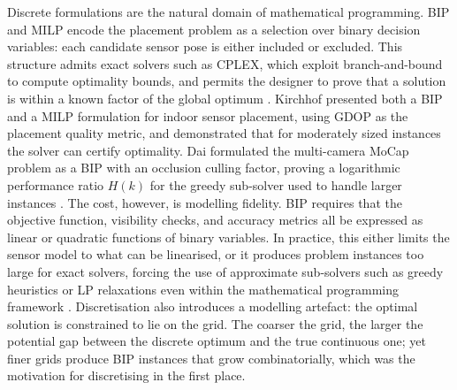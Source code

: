 Discrete formulations are the natural domain of mathematical programming. \gls{BIP} and \gls{MILP} encode the placement problem as a selection over binary decision variables: each candidate sensor pose is either included or excluded. This structure admits exact solvers such as CPLEX, which exploit branch-and-bound to compute optimality bounds, and permits the designer to prove that a solution is within a known factor of the global optimum \parencite{kirchhofOptimalPlacementMultiple2013}. Kirchhof presented both a \gls{BIP} and a \gls{MILP} formulation for indoor sensor placement, using \gls{GDOP} as the placement quality metric, and demonstrated that for moderately sized instances the solver can certify optimality. Dai formulated the multi-camera \gls{MoCap} problem as a \gls{BIP} with an occlusion culling factor, proving a logarithmic performance ratio $H(k)$ for the greedy sub-solver used to handle larger instances \parencite{daiOptimalCameraConfiguration}. The cost, however, is modelling fidelity. \gls{BIP} requires that the objective function, visibility checks, and accuracy metrics all be expressed as linear or quadratic functions of binary variables. In practice, this either limits the sensor model to what can be linearised, or it produces problem instances too large for exact solvers, forcing the use of approximate sub-solvers such as greedy heuristics or LP relaxations even within the mathematical programming framework \parencite{zhaoApproximateTechniquesSolving2013}. Discretisation also introduces a modelling artefact: the optimal solution is constrained to lie on the grid. The coarser the grid, the larger the potential gap between the discrete optimum and the true continuous one; yet finer grids produce \gls{BIP} instances that grow combinatorially, which was the motivation for discretising in the first place.

